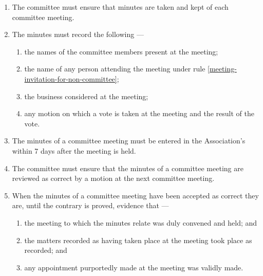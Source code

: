 \documentclass[../constitution.tex]{subfiles}
\begin{document}
\begin{enumerate}

\item The committee must ensure that minutes are taken and kept of each committee meeting.
\item The minutes must record the following ---

  \begin{enumerate}
  
  \item the names of the committee members present at the meeting;
  \item the name of any person attending the meeting under rule \ref{meeting-invitation-for-non-committee};
  \item the business considered at the meeting;
  \item any motion on which a vote is taken at the meeting and the result of the vote.
  \end{enumerate}
\item The minutes of a committee meeting must be entered in the Association's  within 7 days after the meeting is held. 
\item The committee must ensure that the minutes of a committee meeting are reviewed  as correct by a motion at the next committee meeting.  
\item When the minutes of a committee meeting have been accepted as correct they are, until the contrary is proved, evidence that ---

  \begin{enumerate}
  
  \item the meeting to which the minutes relate was duly convened and held; and
  \item the matters recorded as having taken place at the meeting took place as recorded; and
  \item any appointment purportedly made at the meeting was validly made.
  \end{enumerate}
\end{enumerate}
\end{document}
